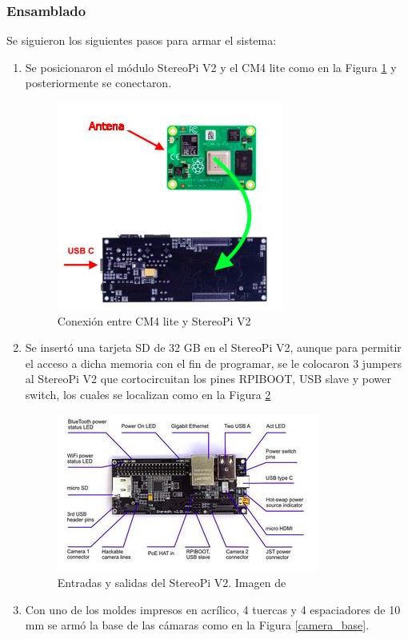 \subsubsection{Ensamblado}
Se siguieron los siguientes pasos para armar el sistema:
\begin{enumerate}
    \item Se posicionaron el módulo StereoPi V2 y el CM4 lite como en la Figura \ref{connect_cm4} y posteriormente se conectaron.
    \begin{figure}[H]
        \centering
        \includegraphics{Recursos/cm4_connect.jpg}
        \caption{Conexión entre CM4 lite y StereoPi V2}
        \label{connect_cm4}
    \end{figure}
    \item Se insertó una tarjeta SD de 32 GB en el StereoPi V2, aunque para permitir el acceso a dicha memoria con el fin de programar, se le colocaron 3 jumpers al StereoPi V2 que cortocircuitan los pines RPIBOOT, USB slave y power switch, los cuales se localizan como en la Figura \ref{stereoPi_IO}
    \begin{figure}[H]
        \centering
        \includegraphics{Recursos/stereoPi_IO.jpg}
        \caption{Entradas y salidas del StereoPi V2. Imagen de \cite{stereopi_quickstart_guide}}
        \label{stereoPi_IO}
    \end{figure}
    \item Con uno de los moldes impresos en acrílico, 4 tuercas y 4 espaciadores de 10 mm se armó la base de las cámaras como en la Figura \ref{camera_base}.

\end{enumerate}
